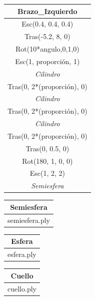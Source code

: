 \documentclass{article}
\begin{document}
\begin{table}[h!]
	\centering
	\label{7}
	\begin{tabular}{|c|}
		\hline
		\textbf{Brazo\_Izquierdo}\\ \hline
		Esc(0.4, 0.4, 0.4)\\ \hline
		Tras(-5.2, 8, 0)\\ \hline
		Rot(10*angulo,0,1,0)\\ \hline
		Esc(1, proporción, 1)\\ \hline
		\textit{Cilindro}\\ \hline
		Tras(0, 2*(proporción), 0)\\ \hline
		\textit{Cilindro}\\ \hline
		Tras(0, 2*(proporción), 0)\\ \hline
		\textit{Cilindro}\\ \hline
		Tras(0, 2*(proporción), 0)\\ \hline
		Tras(0, 0.5, 0)\\ \hline
		Rot(180, 1, 0, 0)\\ \hline
		Esc(1, 2, 2)\\ \hline
		\textit{Semiesfera}\\ \hline
	\end{tabular}
\end{table}

\begin{table}[h!]
	\centering
	\label{8}
	\begin{tabular}{|c|}
		\hline
		\textbf{Semiesfera}\\ \hline
		semiesfera.ply\\ \hline
	\end{tabular}
\end{table}

\begin{table}[h!]
	\centering
	\label{9}
	\begin{tabular}{|c|}
		\hline
		\textbf{Esfera}\\ \hline
		esfera.ply\\ \hline
	\end{tabular}
\end{table}

\begin{table}[h!]
	\centering
	\label{10}
	\begin{tabular}{|c|}
		\hline
		\textbf{Cuello}\\ \hline
		cuello.ply\\ \hline
	\end{tabular}
\end{table}
\end{document}
